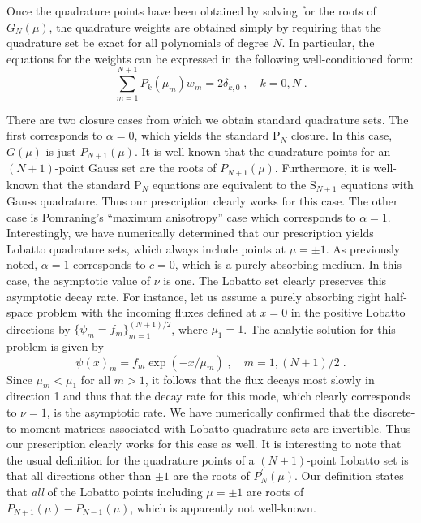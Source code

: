 \documentclass[12pt]{article}
\newcommand{\be}{\begin{equation}}
\newcommand{\ee}{\end{equation}}
\newcommand{\pec}{\; ,}
\newcommand{\pep}{\; .}
\newcommand{\LEQ}[1]{\label{eq:#1}}
\begin{document}

Once the quadrature points have been obtained by solving for the roots of $G_N(\mu)$, 
the quadrature weights are obtained simply by requiring that 
the quadrature set be exact for all polynomials of degree $N$.  In particular, the equations for the weights 
can be expressed in the following well-conditioned form:
\be
\sum_{m=1}^{N+1} P_k(\mu_m) w_m = 2 \delta_{k,0} \pec \quad k=0,N \pep
\LEQ{33}
\ee

There are two closure cases from which we obtain standard quadrature sets. The first 
corresponds to $\alpha=0$, which yields the standard P$_N$ closure.  In this case, $G(\mu)$ is just $P_{N+1}(\mu)$.  
It is well known that the quadrature points for an $(N+1)$-point Gauss set are the roots of $P_{N+1}(\mu)$. Furthermore, 
it is well-known that the standard P$_N$ equations are equivalent to the S$_{N+1}$ equations with Gauss quadrature. Thus 
our prescription clearly works for this case.  The other case is Pomraning's ``maximum anisotropy'' case which corresponds 
to $\alpha=1$.  Interestingly, we have numerically determined that our prescription yields Lobatto quadrature sets, which 
always include points at $\mu=\pm 1$.  As previously noted, $\alpha=1$ corresponds to $c=0$, which is a purely absorbing medium. 
In this case, the asymptotic value of $\nu$ is one.  The Lobatto set clearly preserves this asymptotic decay rate. 
For instance, let us assume a purely absorbing right half-space problem with the incoming fluxes defined at $x=0$ in the 
positive Lobatto directions by $\{\psi_m=f_m\}_{m=1}^{(N+1)/2}$, where $\mu_1 = 1$. The analytic solution for this problem 
is given by 
\be
\psi(x)_m = f_m \exp(-x/\mu_m) \pec \quad m=1,(N+1)/2 \pep
\LEQ{34}
\ee
Since $\mu_m < \mu_1$ for all $m > 1$, it follows that the flux decays most slowly in direction 1 and thus that the decay rate 
for this mode, which clearly corresponds to $\nu=1$, is the asymptotic rate.  We have numerically confirmed that the discrete-to-moment matrices 
associated with Lobatto quadrature sets are invertible.  Thus our prescription clearly works for this case as well. It is 
interesting to note that the usual definition for the quadrature points of a $(N+1)$-point Lobatto set is that all directions 
other than $\pm 1$ are the roots of $P^{\prime}_{N}(\mu)$.  Our definition states that {\it all} of the Lobatto points including $\mu=\pm 1$ are 
roots of $P_{N+1}(\mu)-P_{N-1}(\mu)$, which is apparently not well-known.
\end{document}
